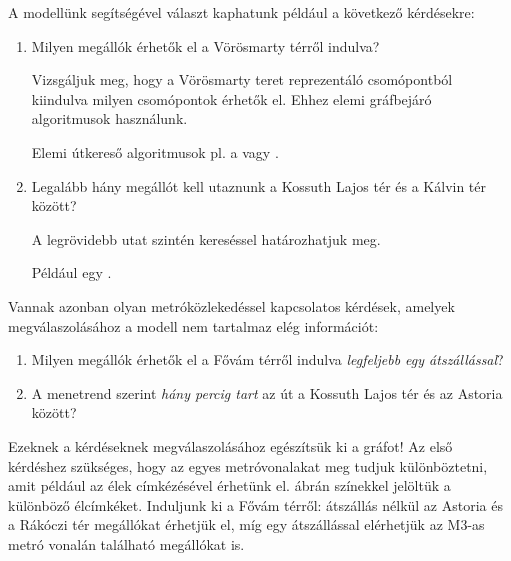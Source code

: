 A modellünk segítségével választ kaphatunk például a következő kérdésekre:

\begin{enumerate}
	\item Milyen megállók érhetők el a Vörösmarty térről indulva?

		Vizsgáljuk meg, hogy a Vörösmarty teret reprezentáló csomópontból kiindulva milyen csomópontok érhetők el. Ehhez elemi gráfbejáró algoritmusok használunk.

		\begin{megjegyzes}
			Elemi útkereső algoritmusok pl. a  vagy .
		\end{megjegyzes}
	\item Legalább hány megállót kell utaznunk a Kossuth Lajos tér és a Kálvin tér között?

		A legrövidebb utat szintén kereséssel határozhatjuk meg.

		\begin{megjegyzes}
			Például egy \fogalomragozva{BFS}{szélességi kereséssel}.
		\end{megjegyzes}

\end{enumerate}

Vannak azonban olyan metróközlekedéssel kapcsolatos kérdések, amelyek megválaszolásához a modell nem tartalmaz elég információt:

\begin{enumerate}
	\item Milyen megállók érhetők el a Fővám térről indulva \emph{legfeljebb egy átszállással}?
	\item A menetrend szerint \emph{hány percig tart} az út a Kossuth Lajos tér és az Astoria között?
\end{enumerate}

Ezeknek a kérdéseknek megválaszolásához egészítsük ki a gráfot! Az első kérdéshez szükséges, hogy az egyes metróvonalakat meg tudjuk különböztetni, amit például az élek címkézésével érhetünk el.  ábrán színekkel jelöltük a különböző élcímkéket. Induljunk ki a Fővám térről: átszállás nélkül az Astoria és a Rákóczi tér megállókat érhetjük el, míg egy átszállással elérhetjük az M3-as metró vonalán található megállókat is.

